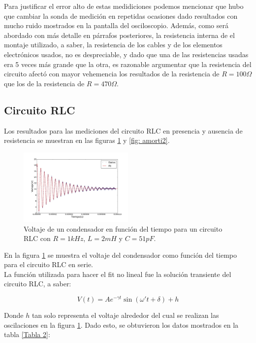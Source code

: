 \documentclass[prb,aps,twocolumn,preprintnumbers,amsmath,amssymb]{revtex4}
\begin{document}
Para justificar el error alto de estas medidiciones podemos mencionar que hubo que cambiar la sonda de medición en repetidas ocasiones dado resultados con mucho ruido mostrados en la pantalla del osciloscopio. Además, como será abordado con más detalle en párrafos posteriores, la resistencia interna de el montaje utilizado, a saber, la resistencia de los cables y de los elementos electrónicos usados, no es despreciable, y dado que una de las resistencias usadas era 5 veces más grande que la otra, es razonable argumentar que la resistencia del circuito afectó con mayor vehemencia los resultados de la resistencia de $R = 100 \Omega$ que los de la resistencia de $R = 470 \Omega$.

\subsection{Circuito RLC}

Los resultados para las mediciones del circuito RLC en presencia y ausencia de resistencia se muestran en las figuras \ref{fig: amorti1} y \ref{fig: amorti2}.

\begin{figure}[h!]
	\centering
	\includegraphics[width=0.5\textwidth,height=0.25\textheight]{amorti1}
	\caption{Voltaje de un condensador en función del tiempo para un circuito RLC con $R = 1 kHz$, $L = 2 mH$ y $C = 51 pF$.}
	\label{fig: amorti1}
\end{figure}

En la figura \ref{fig: amorti1} se muestra el voltaje del condensador como función del tiempo para el circuito RLC en serie.\\

La función utilizada para hacer el fit no lineal fue la solución transiente del circuito RLC, a saber:

\begin{equation}
\label{transi}
V(t) = Ae^{- \gamma t}\sin(\omega ' t + \delta) + h
\end{equation}

Donde $h$ tan solo representa el voltaje alrededor del cual se realizan las oscilaciones en la figura \ref{fig: amorti1}. Dado esto, se obtuvieron los datos mostrados en la tabla \ref{Tabla 2}:
\end{document}
